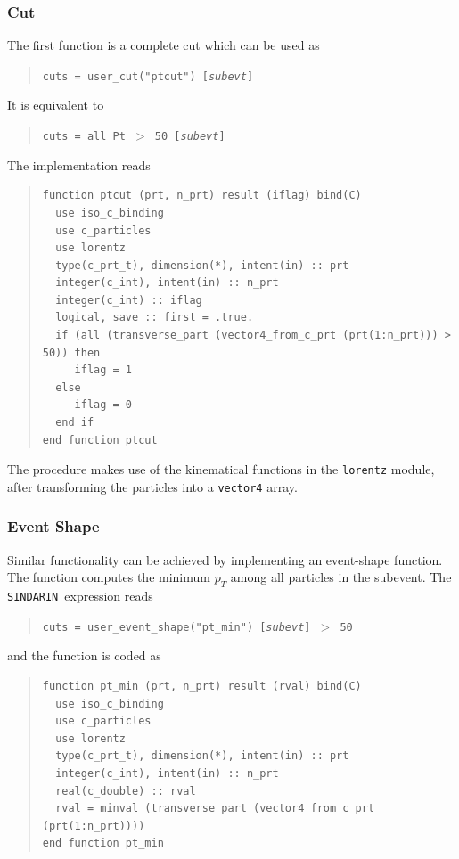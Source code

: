 \documentclass[12pt]{book}
\newcommand{\ttt}[1]{\texttt{#1}}
\newcommand{\sindarin}{\texttt{SINDARIN}}
\begin{document}
\subsubsection{Cut}
The first function is a complete cut which can be used as 
\begin{quote}
  \begin{footnotesize}
    \ttt{cuts = user\_cut("ptcut") [\emph{subevt}]}
  \end{footnotesize}
\end{quote}
It is equivalent to
\begin{quote}
  \begin{footnotesize}
    \ttt{cuts = all Pt $>$ 50 [\emph{subevt}]}
  \end{footnotesize}
\end{quote}
The implementation reads
\begin{quote}
\begin{footnotesize}
\begin{verbatim}
function ptcut (prt, n_prt) result (iflag) bind(C)
  use iso_c_binding
  use c_particles
  use lorentz
  type(c_prt_t), dimension(*), intent(in) :: prt
  integer(c_int), intent(in) :: n_prt
  integer(c_int) :: iflag
  logical, save :: first = .true.
  if (all (transverse_part (vector4_from_c_prt (prt(1:n_prt))) > 50)) then
     iflag = 1
  else
     iflag = 0
  end if
end function ptcut
\end{verbatim}
\end{footnotesize}
\end{quote}
The procedure makes use of the kinematical functions in the
\ttt{lorentz} module, after transforming the particles into a
\ttt{vector4} array.

\subsubsection{Event Shape}
Similar functionality can be achieved by implementing an event-shape
function.  The function computes the minimum $p_T$ among all particles
in the subevent.  The \sindarin\ expression reads
\begin{quote}
  \begin{footnotesize}
    \ttt{cuts = user\_event\_shape("pt\_min") [\emph{subevt}] $>$ 50}
  \end{footnotesize}
\end{quote}
and the function is coded as
\begin{quote}
\begin{footnotesize}
\begin{verbatim}
function pt_min (prt, n_prt) result (rval) bind(C)
  use iso_c_binding
  use c_particles
  use lorentz
  type(c_prt_t), dimension(*), intent(in) :: prt
  integer(c_int), intent(in) :: n_prt
  real(c_double) :: rval
  rval = minval (transverse_part (vector4_from_c_prt (prt(1:n_prt))))
end function pt_min
\end{verbatim}
\end{footnotesize}
\end{quote}
\end{document}
